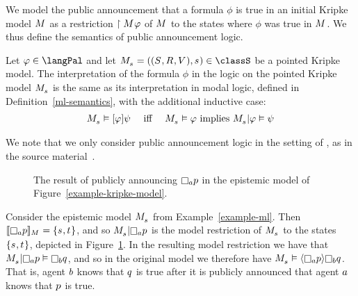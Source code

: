 We model the public announcement that a formula $\phi$ is true in an initial Kripke model $\kModel$ as a restriction $\restriction{\kModel}{\phi}$ of $\kModel$ to the states where $\phi$ was true in $\kModel$.
We thus define the semantics of public announcement logic.

\begin{definition}\label{pal-semantics}
Let $\phi \in \langPal$ and let $\kPModelAndTuple{\kStateS} \in \classS$ be a pointed Kripke model.
The interpretation of the formula $\phi$ in the logic \logicPalS{} on the pointed Kripke model $\kPModel{\kStateS}$ is the same as its interpretation in modal logic, defined in Definition~\ref{ml-semantics}, with the additional inductive case:
$$
\begin{array}{lcl}
\kPModel{\kStateS} \entails \announceA{\phi} \psi & \text{ iff } & \kPModel{\kStateS} \entails \phi \text{ implies } \restrict{\kPModel{\kStateS}}{\phi} \entails \psi
\end{array}
$$
\end{definition}

We note that we only consider public announcement logic in the setting of \classS{}, as in the source material~\cite{plaza:1989}.

\begin{example}\label{example-pal}
\begin{figure}
    \caption{The result of publicly announcing $\knowsA \atomP$ in the epistemic model of Figure~\ref{example-kripke-model}.}\label{example-public-announcement}
    \centering
\end{figure}
Consider the epistemic model $\kPModel{\kStateS}$ from Example~\ref{example-ml}.
Then $\interpretation[\kModel]{\knowsA \atomP} = \{\kStateS, \kStateT\}$, and so $\restrict{\kPModel{\kStateS}}{\knowsA \atomP}$ is the model restriction of $\kPModel{\kStateS}$ to the states $\{\kStateS, \kStateT\}$, depicted in Figure~\ref{example-public-announcement}.  
In the resulting model restriction we have that $\restrict{\kPModel{\kStateS}}{\knowsA \atomP} \entails \knowsB \atomQ$, and so in the original model we therefore have $\kPModel{\kStateS} \entails \announceE{\knowsA \atomP} \knowsB \atomQ$.
That is, agent $b$ knows that $q$ is true after it is publicly announced that agent $a$ knows that $p$ is true.
\end{example}

